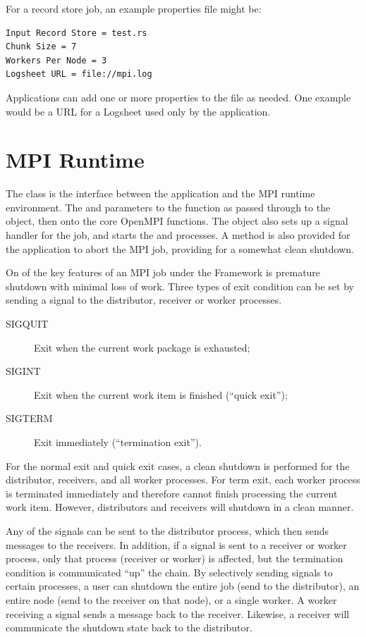 For a record store job, an example properties file might be:
\begin{verbatim}
Input Record Store = test.rs
Chunk Size = 7
Workers Per Node = 3
Logsheet URL = file://mpi.log
\end{verbatim}

Applications can add one or more properties to the file as needed. One example
would be a URL for a Logsheet used only by the application.

\section{MPI Runtime}
\label{sec-mpiruntime}

The  class is the interface between the application and the
MPI runtime environment. The  and  parameters
to the  function as passed through to the 
object, then onto the core OpenMPI functions. The  object 
also sets up a signal handler for the job, and starts the 
and  processes.  A method is also provided for the application
to abort the MPI job, providing for a somewhat clean shutdown.

On of the key features of an MPI job under the Framework is premature shutdown
with minimal loss of work. Three types of exit condition can be set by sending
a signal to the distributor, receiver or worker processes. 

\begin{description}
\item[SIGQUIT] Exit when the current work package is exhausted;
\item[SIGINT] Exit when the current work item is finished (``quick exit'');
\item[SIGTERM] Exit immediately (``termination exit'').
\end{description}

For the normal exit and quick exit cases, a clean shutdown is performed for
the distributor, receivers, and all worker processes. For term exit, each
worker process is terminated immediately and therefore cannot finish processing
the current work item. However, distributors and receivers will shutdown in a
clean manner.

Any of the signals can be sent to the distributor process, which then sends
messages to the receivers. In addition, if a signal is sent to a receiver or
worker process, only that process (receiver or worker) is affected, but the
termination condition is communicated ``up'' the chain. By selectively sending
signals to certain processes, a user can shutdown the entire job (send to the
distributor), an entire node (send to the receiver on that node), or a single
worker. A worker receiving a signal sends a message back to the receiver.
Likewise, a receiver will communicate the shutdown state back to the
distributor.

